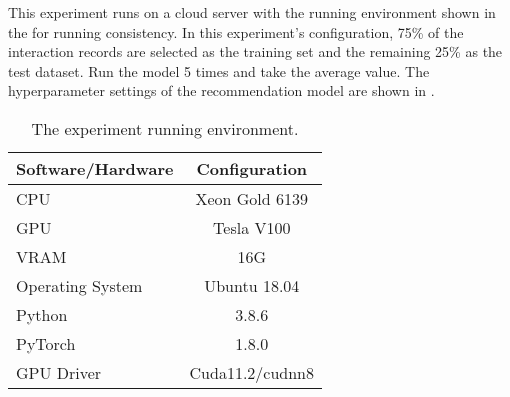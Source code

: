
This experiment runs on a cloud server with the running environment shown in the \tblname{\ref{tbl:ch4-exp-env}} for running consistency. In this experiment's configuration, 75\% of the interaction records are selected as the training set and the remaining 25\% as the test dataset. Run the model 5 times and take the average value. The hyperparameter settings of the recommendation model are shown in \tblname{\ref{tbl:ch4-hpsetting}}.

\begin{table}[htbp!]
    \caption{The experiment running environment.}\label{tbl:ch4-exp-env}
    \centering
    \begin{tabular}{l c}
        \toprule
        Software/Hardware & Configuration   \\
        \midrule
        CPU               & Xeon Gold 6139  \\
        GPU               & Tesla V100      \\
        VRAM              & 16G             \\
        Operating System  & Ubuntu 18.04    \\
        Python            & 3.8.6           \\
        PyTorch           & 1.8.0           \\
        GPU Driver        & Cuda11.2/cudnn8 \\
        \bottomrule
    \end{tabular}
\end{table}

